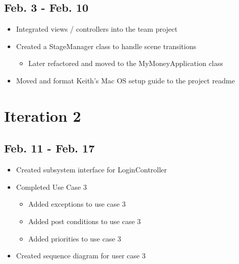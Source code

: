 \documentclass[12pt]{article}
\begin{document}
\subsection*{Feb. 3 - Feb. 10}
\begin{itemize}
    \item Integrated views / controllers into the team project
    \item Created a StageManager class to handle scene transitions
    \begin{itemize}
        \item Later refactored and moved to the MyMoneyApplication class 
    \end{itemize}
    \item Moved and format Keith's Mac OS setup guide to the project readme
\end{itemize}

\section*{Iteration 2}

\subsection*{Feb. 11 - Feb. 17}
\begin{itemize}
    \item Created subsystem interface for LoginController
    \item Completed Use Case 3
    \begin{itemize}
        \item Added exceptions to use case 3
        \item Added post conditions to use case 3
        \item Added priorities to use case 3
    \end{itemize}
    \item Created sequence diagram for user case 3
\end{itemize}
\end{document}
